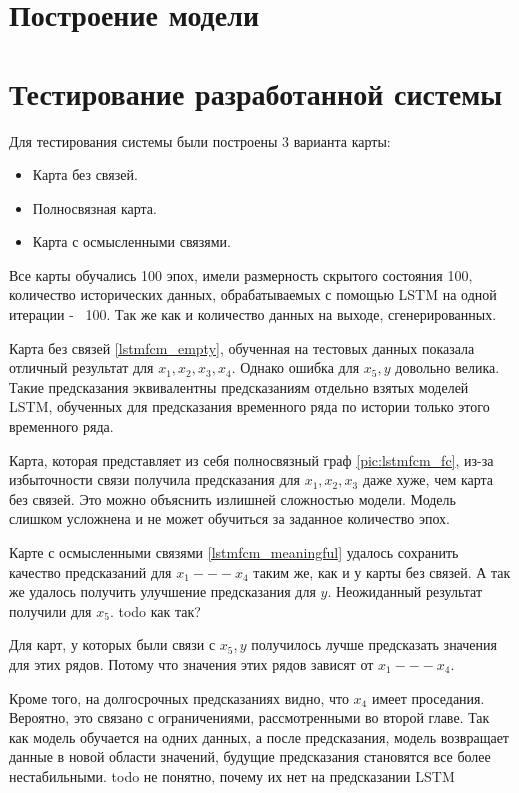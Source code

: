 \section{Построение модели}

\section{Тестирование разработанной системы}

Для тестирования системы были построены 3 варианта карты:
\begin{itemize}
	\item Карта без связей.
	\item Полносвязная карта.
	\item Карта с осмысленными связями.
\end{itemize}

Все карты обучались 100 эпох, имели размерность скрытого состояния 100,
количество исторических данных, обрабатываемых с помощью LSTM на одной итерации -~ 100.
Так же как и количество данных на выходе, сгенерированных.


Карта без связей \ref{lstmfcm_empty}, обученная на тестовых данных
показала отличный результат для $ x_1, x_2, x_3, x_4  $. Однако ошибка
для $ x_5, y $ довольно велика. Такие предсказания эквивалентны предсказаниям
отдельно взятых моделей LSTM, обученных для предсказания временного ряда
по истории только этого временного ряда.

Карта, которая представляет из себя полносвязный граф \ref{pic:lstmfcm_fc},
из-за избыточности связи получила предсказания для $ x_1, x_2, x_3 $ даже
хуже, чем карта без связей. Это можно объяснить излишней сложностью модели.
Модель слишком усложнена и не может обучиться за заданное количество эпох.

Карте с осмысленными связями \ref{lstmfcm_meaningful} удалось сохранить качество
предсказаний для $ x_1 --- x_4 $ таким же, как и у карты без связей.
А так же удалось получить улучшение предсказания для $ y $.
Неожиданный результат получили для $ x_5 $. todo как так?

Для карт, у которых были связи с $ x_5, y $ получилось лучше предсказать значения
для этих рядов. Потому что значения этих рядов зависят от $ x_1 --- x_4 $.

Кроме того, на долгосрочных предсказаниях видно, что $ x_4 $ имеет проседания.
Вероятно, это связано с ограничениями, рассмотренными во второй главе.
Так как модель обучается на одних данных, а после предсказания, модель возвращает
данные в новой области значений, будущие предсказания становятся все более нестабильными.
todo не понятно, почему их нет на предсказании LSTM

